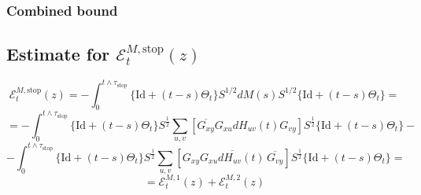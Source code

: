 \documentclass[11pt]{article}
\newcommand{\E}{\mathcal{E}}
\newcommand{\sto}{\text{stop}}
\begin{document}
\subsubsection*{Combined bound}

\subsection{Estimate for $\E_t^{M, \text{stop}}(z)$}

$$\E_t^{M, \text{stop}}(z)=-\int_0^{t\wedge \tau_\sto} \{\text{Id} + (t-s)\Theta_t\} S^{1/2}dM(s)S^{1/2} \{\text{Id} + (t-s)\Theta_t\}= $$$$=-\int_0^{t\wedge \tau_\sto} \{\text{Id} + (t-s)\Theta_t\}S^{\frac{1}{2}}\sum_{u, v}\left[\overline{G_{xy}}G_{xu}dH_{uv}(t)G_{vy}\right]S^{\frac{1}{2}}\{\text{Id} + (t-s)\Theta_t\}-$$
$$- \int_0^{t\wedge \tau_\sto} \{\text{Id} + (t-s)\Theta_t\}S^{\frac{1}{2}}\sum_{u, v}\left[G_{xy}\overline{G_{xu}dH_{uv}(t)}\,\overline{G_{vy}}\right]S^{\frac{1}{2}}\{\text{Id} + (t-s)\Theta_t\}=$$
$$=\E_t^{M, 1}(z)+\E_t^{M, 2}(z)$$
\end{document}
